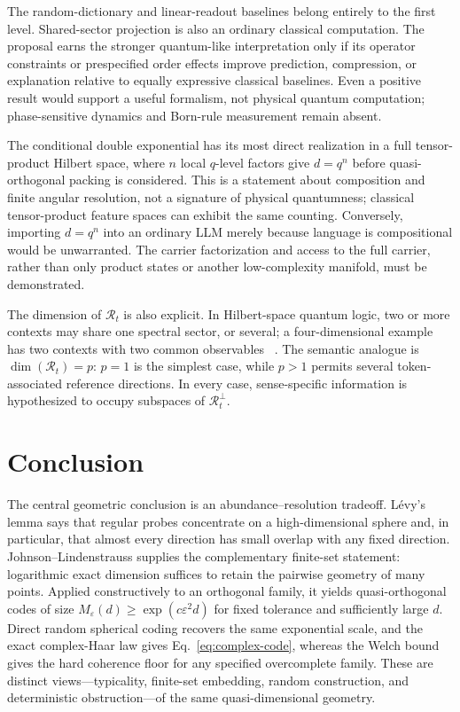 \documentclass[
  aps,
  reprint,
  superscriptaddress,
  floatfix,
  nofootinbib,
  longbibliography
]{revtex4-2}
\begin{document}
The random-dictionary and linear-readout baselines belong entirely to the first
level.  Shared-sector projection is also an ordinary classical computation.
The proposal earns the stronger quantum-like interpretation only if its
operator constraints or prespecified order effects improve prediction,
compression, or explanation relative to equally expressive classical
baselines.  Even a positive result would support a useful formalism, not
physical quantum computation; phase-sensitive dynamics and Born-rule
measurement remain absent.

The conditional double exponential has its most direct realization in a
full tensor-product Hilbert space, where $n$ local $q$-level factors give
$d=q^n$ before quasi-orthogonal packing is considered.  This is a statement
about composition and finite angular resolution, not a signature of physical
quantumness; classical tensor-product feature spaces can exhibit the same
counting.  Conversely, importing $d=q^n$ into an ordinary LLM merely because
language is compositional would be unwarranted.  The carrier factorization and
access to the full carrier, rather than only product states or another
low-complexity manifold, must be demonstrated.

The dimension of $\mathcal R_t$ is also explicit. In Hilbert-space quantum
logic, two or more contexts may share one spectral sector, or several; a
four-dimensional example has two contexts with two common observables
~\cite{svozil:040102}. The semantic
analogue is $\dim(\mathcal R_t)=p$: $p=1$ is the simplest case, while
$p>1$ permits several token-associated reference directions. In every case,
sense-specific information is hypothesized to occupy subspaces of
$\mathcal R_t^\perp$.

\section{Conclusion}
\label{sec:conclusion}

The central geometric conclusion is an abundance--resolution tradeoff.
L\'evy's lemma says that regular probes concentrate on a high-dimensional
sphere and, in particular, that almost every direction has small overlap with
any fixed direction.  Johnson--Lindenstrauss supplies the complementary
finite-set statement: logarithmic exact dimension suffices to retain the
pairwise geometry of many points.  Applied constructively to an orthogonal
family, it yields quasi-orthogonal codes of size
$M_\varepsilon(d)\geq\exp(c\varepsilon^2d)$ for fixed tolerance and
sufficiently large $d$.  Direct random spherical coding recovers the same
exponential scale, and the exact complex-Haar law gives
Eq.~\eqref{eq:complex-code}, whereas the Welch bound gives the hard
coherence floor for any specified overcomplete family.  These are distinct
views---typicality, finite-set embedding, random construction, and
deterministic obstruction---of the same quasi-dimensional geometry.
\end{document}
